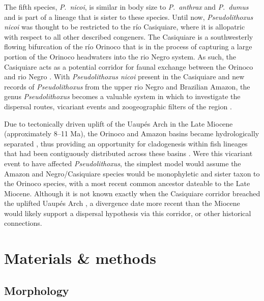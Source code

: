 \documentclass[12pt]{article}
\begin{document}
The fifth species, \emph{P}.\ \emph{nicoi}, is similar in body size to \emph{P}.\ \emph{anthrax} and \emph{P}.\ \emph{dumus} and is part of a lineage that is sister to these species. %
 Until now, \emph{Pseudolithoxus nicoi} was thought to be restricted to the río Casiquiare, where it is allopatric with respect to all other described congeners. %
 The Casiquiare is a southwesterly flowing bifurcation of the río Orinoco that is in the process of capturing a large portion of the Orinoco headwaters into the rio Negro system. %
 As such, the Casiquiare acts as a potential corridor for faunal exchange between the Orinoco and rio Negro \citep{Lujan2011kelsorum,Winemiller2008,Winemiller2011}. %
 With \emph{Pseudolithoxus nicoi} present in the Casiquiare and new records of \emph{Pseudolithoxus} from the upper rio Negro and Brazilian Amazon, the genus \emph{Pseudolithoxus} becomes a valuable system in which to investigate the dispersal routes, vicariant events and zoogeographic filters of the region \citep{Winemiller2008}.%
 
Due to tectonically driven uplift of the Uaupés Arch in the Late Miocene (approximately 8–11 Ma), the Orinoco and Amazon basins became hydrologically separated \citep{Albert2011,Lundberg1998,Wesselingh2011}, thus providing an opportunity for cladogenesis within fish lineages that had been contiguously distributed across these basins \citep{Lovejoy2010}. %
 Were this vicariant event to have affected \emph{Pseudolithoxus}, the simplest model would assume the Amazon and Negro/Casiquiare species would be monophyletic and sister taxon to the Orinoco species, with a most recent common ancestor dateable to the Late Miocene. %
 Although it is not known exactly when the Casiquiare corridor breached the uplifted Uaupés Arch \citep{Willis2010,Winemiller2011}, a divergence date more recent than the Miocene would likely support a dispersal hypothesis via this corridor, or other historical connections.%


\section*{Materials \& methods}

\subsection*{Morphology}
\end{document}
